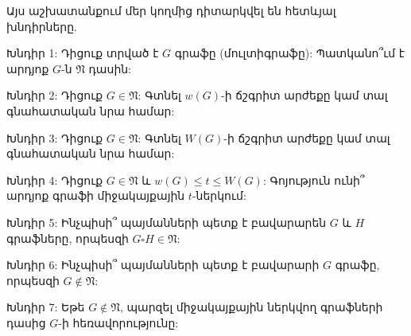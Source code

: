 Այս աշխատանքում մեր կողմից դիտարկվել են հետևյալ խնդիրները.

Խնդիր 1: Դիցուք տրված է $G$ գրաֆը (մուլտիգրաֆը): Պատկանո՞ւմ է արդյոք $G$-ն $\mathfrak{N}$ դասին:

Խնդիր 2: Դիցուք $G\in\mathfrak{N}$: Գտնել $w(G)$-ի ճշգրիտ արժեքը կամ տալ գնահատական նրա համար:

Խնդիր 3: Դիցուք $G\in\mathfrak{N}$: Գտնել $W(G)$-ի ճշգրիտ արժեքը կամ տալ գնահատական նրա համար:

Խնդիր 4: Դիցուք $G\in\mathfrak{N}$ և $w(G) \leq t \leq W(G)$: Գոյություն ունի՞ արդյոք գրաֆի միջակայքային $t$-ներկում:

Խնդիր 5: Ինչպիսի՞ պայմանների պետք է բավարարեն $G$ և $H$ գրաֆները, որպեսզի $G \square H \in \mathfrak{N}$:

Խնդիր 6: Ինչպիսի՞ պայմանների պետք է բավարարի $G$ գրաֆը, որպեսզի $G \notin \mathfrak{N}$:

Խնդիր 7: Եթե $G \notin \mathfrak{N}$, պարզել միջակայքային ներկվող գրաֆների դասից $G$-ի հեռավորությունը: 
